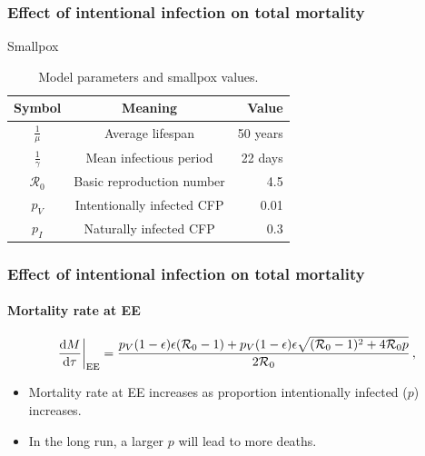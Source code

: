 \documentclass[12pt]{beamer}
\newcommand\dbyd[2]{\frac{\mathrm d{#1}}{\mathrm d{#2}}}
\newcommand{\R}{\mathcal{R}}
\newcommand{\pmV}{p_{V}}
\newcommand{\pmI}{p_{I}}
\begin{document}
\begin{frame}
\frametitle{Effect of intentional infection on total mortality}
\begin{center}
Smallpox
\end{center}
\begin{table}[H]\label{tab:params}
\begin{center}
\caption{Model parameters and smallpox values.}
\smallskip
\begin{tabular}{c|c|r}
{\bfseries Symbol} & {\bfseries Meaning} & {\bfseries Value} \\\hline
$\frac{1}{\mu}$ & Average lifespan & 50 years \\
$\frac{1}{\gamma}$ & Mean infectious period & 22 days \\
$\R_0$ & Basic reproduction number & 4.5\\
$\pmV$ & Intentionally infected CFP & 0.01\\
$\pmI$ & Naturally infected CFP & 0.3
\end{tabular}
\end{center}
\end{table}
\end{frame}
\begin{frame}
\frametitle{Effect of intentional infection on total mortality}
\framesubtitle{Mortality rate at EE}
\begin{equation}
\left. \dbyd{M}{\tau}\right|_{\rm EE}=\frac{\pmV(1-\epsilon)\epsilon(\R_0 -1)+ \pmV(1-\epsilon)\epsilon \sqrt{(\R_0-1)^2+4\R_0 p}}{2\R_0}\,,
\end{equation}
\pause
\begin{itemize}
\item Mortality rate at EE increases as proportion intentionally infected ($p$) increases.
\pause
\item In the long run, a larger $p$ will lead to more deaths.
\end{itemize}
\end{frame}
\end{document}

